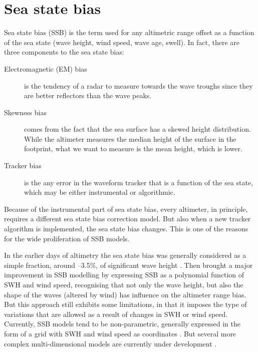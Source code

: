 \documentclass[a4paper,11pt,openany,natbib,nomargin]{thesis}
\begin{document}
\section{Sea state bias}
\label{var:ssb}
Sea state bias (SSB) is the term used for any altimetric range offset as a function of the sea state (wave height, wind speed, wave age, swell). In fact, there are three components to the sea state bias:
\begin{description}
\item[Electromagnetic (EM) bias] is the tendency of a radar to measure towards the wave troughs since they are better reflectors than the wave peaks.
\item[Skewness bias] comes from the fact that the sea surface has a skewed height distribution. While the altimeter measures the median height of the surface in the footprint, what we want to measure is the mean height, which is lower.
\item[Tracker bias] is the any error in the waveform tracker that is a function of the sea state, which may be either instrumental or algorithmic.
\end{description}

Because of the instrumental part of sea state bias, every altimeter, in principle, requires a different sea state bias correction model. But also when a new tracker algorithm is implemented, the sea state bias changes. This is one of the reasons for the wide proliferation of SSB models.

In the earlier days of altimetry the sea state bias was generally considered as a simple fraction, around --3.5\%, of significant wave height \citep{chelton1994}. Then \citet{gaspar1994a} brought a major improvement in SSB modelling by expressing SSB as a polynomial function of SWH and wind speed, recognising that not only the wave height, but also the shape of the waves (altered by wind) has influence on the altimeter range bias. But this approach still exhibits some limitations, in that it imposes the type of variations that are allowed as a result of changes in SWH or wind speed. Currently, SSB models tend to be non-parametric, generally expressed in the form of a grid with SWH and wind speed as coordinates \citep[e.g.,][]{gaspar1998b}. But several more complex multi-dimensional models are currently under development \citep[e.g.,][]{feng2010,tran2010}.
\end{document}
